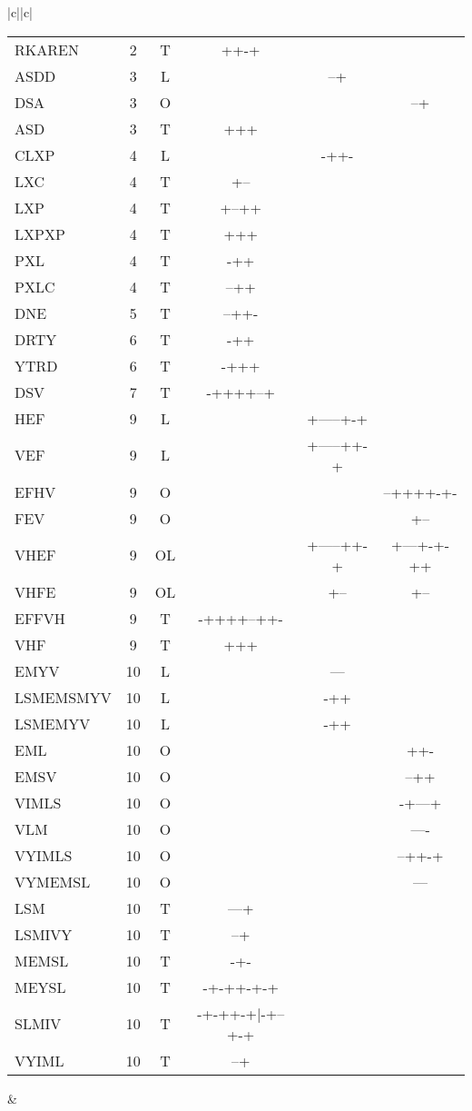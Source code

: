 \documentclass[table,
12pt, %
a4paper, %
oneside, %
headinclude,footinclude, %
BCOR5mm, %
]{scrartcl}
\begin{document}
\begin{table}[htbp]
\begin{adjustbox}{totalheight=\textheight,center}
\begin{tabular}{|c||c|}
\begin{tabular}{l ccccc}
RKAREN&2&T&++-+&&\\
\rowcolor{lightgray}
ASDD&3&L&&--+&\\
DSA&3&O&&&--+\\
ASD&3&T&+++&&\\
\rowcolor{shadecolor}
CLXP&4&L&&-++-&\\
LXC&4&T&+--&&\\
LXP&4&T&+--++&&\\
LXPXP&4&T&+++&&\\
PXL&4&T&-++&&\\
PXLC&4&T&--++&&\\
\rowcolor{lightgray}
DNE&5&T&--++-&&\\
\rowcolor{shadecolor}
DRTY&6&T&-++&&\\
YTRD&6&T&-+++&&\\
\rowcolor{lightgray}
DSV&7&T&-++++--+&&\\
\rowcolor{shadecolor}
HEF&9&L&&+-----+-+&\\
VEF&9&L&&+-----++-+&\\
EFHV&9&O&&&--++++-+-\\
FEV&9&O&&&+--\\
VHEF&9&OL&&+-----++-+&+---+-+-++\\
VHFE&9&OL&&+--&+--\\
EFFVH&9&T&-++++--++-&&\\
VHF&9&T&+++&&\\
\rowcolor{lightgray}
EMYV&10&L&&---&\\
LSMEMSMYV&10&L&&-++&\\
LSMEMYV&10&L&&-++&\\
EML&10&O&&&++-\\
EMSV&10&O&&&--++\\
VIMLS&10&O&&&-+---+\\
VLM&10&O&&&----\\
VYIMLS&10&O&&&--++-+\\
VYMEMSL&10&O&&&---\\
LSM&10&T&---+&&\\
LSMIVY&10&T&--+&&\\
MEMSL&10&T&-+-&&\\
MEYSL&10&T&-+-++-+-+&&\\
SLMIV&10&T&-+-++-+|-+--+-+&&\\
VYIML&10&T&--+&&\\
\end{tabular} &


\end{tabular}
\end{adjustbox}
\end{table}
\end{document}
